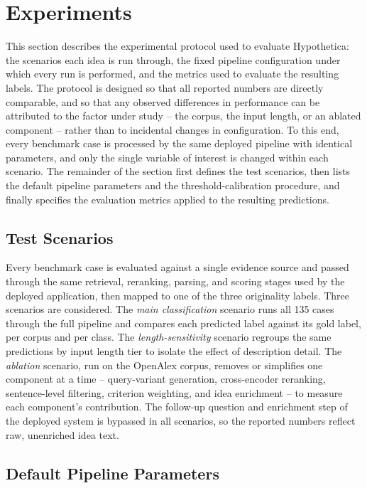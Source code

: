 \section{Experiments}
\label{sec:testing}

This section describes the experimental protocol used to evaluate Hypothetica: the scenarios each idea is run through, the fixed pipeline configuration under which every run is performed, and the metrics used to evaluate the resulting labels. The protocol is designed so that all reported numbers are directly comparable, and so that any observed differences in performance can be attributed to the factor under study -- the corpus, the input length, or an ablated component -- rather than to incidental changes in configuration. To this end, every benchmark case is processed by the same deployed pipeline with identical parameters, and only the single variable of interest is changed within each scenario. The remainder of the section first defines the test scenarios, then lists the default pipeline parameters and the threshold-calibration procedure, and finally specifies the evaluation metrics applied to the resulting predictions.

\subsection{Test Scenarios}

Every benchmark case is evaluated against a single evidence source and passed through the same retrieval, reranking, parsing, and scoring stages used by the deployed application, then mapped to one of the three originality labels. Three scenarios are considered. The \emph{main classification} scenario runs all 135 cases through the full pipeline and compares each predicted label against its gold label, per corpus and per class. The \emph{length-sensitivity} scenario regroups the same predictions by input length tier to isolate the effect of description detail. The \emph{ablation} scenario, run on the OpenAlex corpus, removes or simplifies one component at a time -- query-variant generation, cross-encoder reranking, sentence-level filtering, criterion weighting, and idea enrichment -- to measure each component's contribution. The follow-up question and enrichment step of the deployed system is bypassed in all scenarios, so the reported numbers reflect raw, unenriched idea text.

\subsection{Default Pipeline Parameters}

